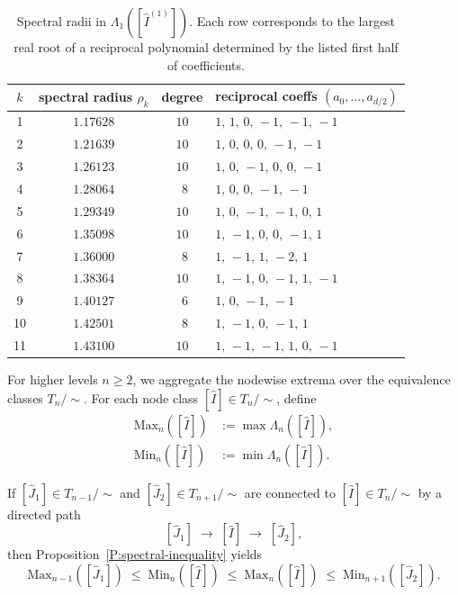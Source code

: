 \documentclass[11pt]{amsart}
\numberwithin{equation}{section}
\newcommand{\Max}{\mathrm{Max}}
\newcommand{\Min}{\mathrm{Min}}
\begin{document}
\begin{table}[h]
\centering
\begin{tabular}{|c|c|c|l|}
\hline
$k$ & spectral radius $\rho_k$ & degree & reciprocal coeffs $(a_0,\dots,a_{d/2})$ \\ \hline\hline
1  & $1.17628$ & $10$ & $1,\,1,\,0,\,-1,\,-1,\,-1$ \\
2  & $1.21639$ & $10$ & $1,\,0,\,0,\,0,\,-1,\,-1$ \\
3  & $1.26123$ & $10$ & $1,\,0,\,-1,\,0,\,0,\,-1$ \\
4  & $1.28064$ & $\;\,8$ & $1,\,0,\,0,\,-1,\,-1$ \\
5  & $1.29349$ & $10$ & $1,\,0,\,-1,\,-1,\,0,\,1$ \\
6  & $1.35098$ & $10$ & $1,\,-1,\,0,\,0,\,-1,\,1$ \\
7  & $1.36000$ & $\;\,8$ & $1,\,-1,\,1,\,-2,\,1$ \\
8  & $1.38364$ & $10$ & $1,\,-1,\,0,\,-1,\,1,\,-1$ \\
9  & $1.40127$ & $\;\,6$ & $1,\,0,\,-1,\,-1$ \\
10 & $1.42501$ & $\;\,8$ & $1,\,-1,\,0,\,-1,\,1$ \\
11 & $1.43100$ & $10$ & $1,\,-1,\,-1,\,1,\,0,\,-1$ \\
\hline
\end{tabular}
\caption{Spectral radii in $\Lambda_1([\widehat I^{(1)}])$.  
Each row corresponds to the largest real root of a reciprocal polynomial determined by the listed first half of coefficients.}
\label{T:Lambda_1}
\end{table}

\medskip
For higher levels $n\ge2$, we aggregate the nodewise extrema over the equivalence classes $T_n/\!\sim$.
For each node class $[\widehat I]\in T_n/\!\sim$, define
\[
\begin{aligned}
\Max_n([\widehat I]) &:= \max \Lambda_n([\widehat I]),\\
\Min_n([\widehat I]) &:= \min \Lambda_n([\widehat I]).
\end{aligned}
\]

If $[\widehat J_1]\in T_{n-1}/\!\sim$ and $[\widehat J_2]\in T_{n+1}/\!\sim$
are connected to $[\widehat I]\in T_n/\!\sim$ by a directed path
\[
[\widehat J_1] \;\longrightarrow\; [\widehat I] \;\longrightarrow\; [\widehat J_2],
\]
then Proposition~\ref{P:spectral-inequality} yields
\[
\Max_{n-1}([\widehat J_1])
\;\le\;
\Min_n([\widehat I])
\;\le\;
\Max_n([\widehat I])
\;\le\;
\Min_{n+1}([\widehat J_2]).
\]
\end{document}
